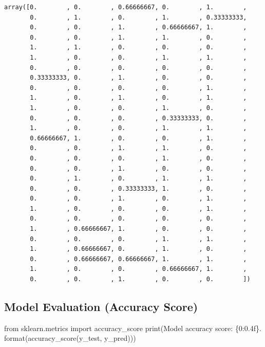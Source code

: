 \documentclass[
  letterpaper,
  DIV=11,
  numbers=noendperiod]{scrreprt}
\newenvironment{Shaded}{\begin{snugshade}}{\end{snugshade}}
\newcommand{\BuiltInTok}[1]{\textcolor[rgb]{0.00,0.23,0.31}{#1}}
\newcommand{\ImportTok}[1]{\textcolor[rgb]{0.00,0.46,0.62}{#1}}
\newcommand{\NormalTok}[1]{\textcolor[rgb]{0.00,0.23,0.31}{#1}}
\newcommand{\SpecialCharTok}[1]{\textcolor[rgb]{0.37,0.37,0.37}{#1}}
\newcommand{\StringTok}[1]{\textcolor[rgb]{0.13,0.47,0.30}{#1}}
\begin{document}
\begin{verbatim}
array([0.        , 0.        , 0.66666667, 0.        , 1.        ,
       0.        , 1.        , 0.        , 1.        , 0.33333333,
       0.        , 0.        , 1.        , 0.66666667, 1.        ,
       0.        , 0.        , 1.        , 1.        , 0.        ,
       1.        , 1.        , 0.        , 0.        , 0.        ,
       1.        , 0.        , 0.        , 1.        , 1.        ,
       0.        , 0.        , 0.        , 0.        , 0.        ,
       0.33333333, 0.        , 1.        , 0.        , 0.        ,
       0.        , 0.        , 0.        , 0.        , 1.        ,
       1.        , 0.        , 1.        , 0.        , 1.        ,
       1.        , 0.        , 0.        , 1.        , 0.        ,
       0.        , 0.        , 0.        , 0.33333333, 0.        ,
       1.        , 0.        , 0.        , 1.        , 1.        ,
       0.66666667, 1.        , 0.        , 0.        , 1.        ,
       0.        , 0.        , 1.        , 1.        , 0.        ,
       0.        , 0.        , 0.        , 1.        , 0.        ,
       0.        , 0.        , 1.        , 0.        , 0.        ,
       0.        , 1.        , 0.        , 1.        , 1.        ,
       0.        , 0.        , 0.33333333, 1.        , 0.        ,
       0.        , 0.        , 1.        , 0.        , 1.        ,
       1.        , 0.        , 0.        , 0.        , 1.        ,
       0.        , 0.        , 0.        , 0.        , 0.        ,
       1.        , 0.66666667, 1.        , 0.        , 0.        ,
       0.        , 0.        , 0.        , 1.        , 1.        ,
       1.        , 0.66666667, 0.        , 1.        , 0.        ,
       0.        , 0.66666667, 0.66666667, 1.        , 1.        ,
       1.        , 0.        , 0.        , 0.66666667, 1.        ,
       0.        , 0.        , 1.        , 0.        , 0.        ])
\end{verbatim}

\subsection{Model Evaluation (Accuracy
Score)}\label{model-evaluation-accuracy-score}

\begin{Shaded}
\begin{Highlighting}[]
\ImportTok{from}\NormalTok{ sklearn.metrics }\ImportTok{import}\NormalTok{ accuracy\_score}
\BuiltInTok{print}\NormalTok{(}\StringTok{\textquotesingle{}Model accuracy score: }\SpecialCharTok{\{0:0.4f\}}\StringTok{\textquotesingle{}}\NormalTok{. }\BuiltInTok{format}\NormalTok{(accuracy\_score(y\_test, y\_pred)))}
\end{Highlighting}
\end{Shaded}
\end{document}
